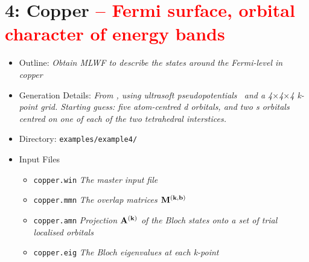 \documentclass[a4paper,11pt,twoside]{article}
\def\tent#1{\textcolor{red}{#1}}     %
\begin{document}
\cleardoublepage


\section*{4: Copper \tent{-- Fermi surface, orbital character of
    energy bands}}

\begin{itemize}
\item{Outline: \it{Obtain MLWF to describe the states around the
    Fermi-level in copper}} 
\item{Generation Details: \it{From \pwscf, using ultrasoft
    pseudopotentials~\cite{USPP} and a
    4$\times$4$\times$4 k-point grid. Starting guess: five 
    atom-centred d orbitals, and two s orbitals centred on one of each
    of the two tetrahedral interstices.}}
\item{Directory: {\tt examples/example4/}}
\item{Input Files}
\begin{itemize}
\item{ {\tt copper.win}  {\it The master input file}}
\item{ {\tt copper.mmn}  {\it The overlap matrices $\mathbf{M}^{(\mathbf{k},\mathbf{b})}$}}
\item{ {\tt copper.amn}  {\it Projection $\mathbf{A}^{(\mathbf{k})}$ of the Bloch states onto a
    set of trial localised orbitals}} 
\item{ {\tt copper.eig}  {\it The Bloch eigenvalues at each k-point}}
\end{itemize}

\end{itemize}
\end{document}
